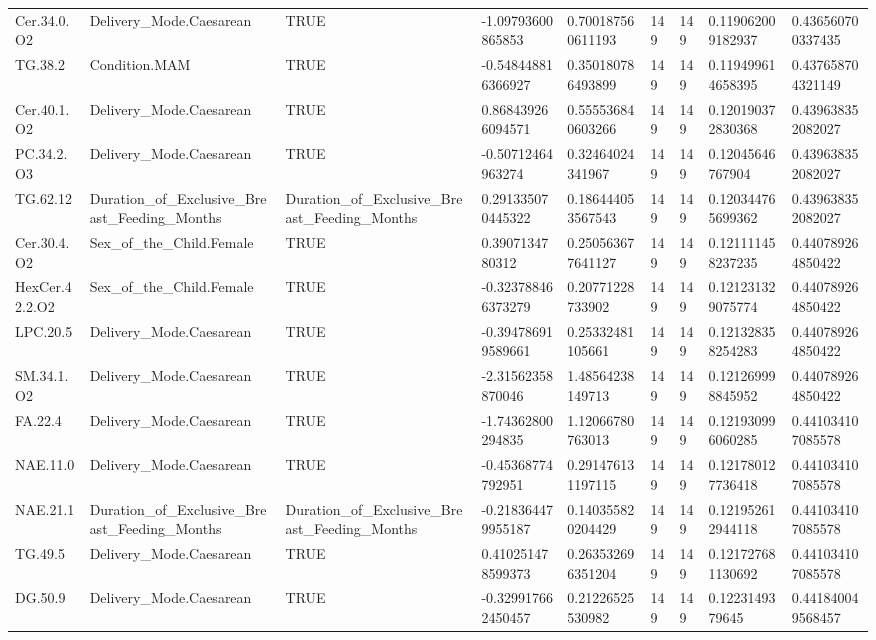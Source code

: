 \begin{longtable}{lllllllll}
Cer.34.0.O2 & Delivery\_Mode.Caesarean & TRUE & -1.09793600865853 & 0.700187560611193 & 149 & 149 & 0.119062009182937 & 0.436560700337435 \\
TG.38.2 & Condition.MAM & TRUE & -0.548448816366927 & 0.350180786493899 & 149 & 149 & 0.119499614658395 & 0.437658704321149 \\
Cer.40.1.O2 & Delivery\_Mode.Caesarean & TRUE & 0.868439266094571 & 0.555536840603266 & 149 & 149 & 0.120190372830368 & 0.439638352082027 \\
PC.34.2.O3 & Delivery\_Mode.Caesarean & TRUE & -0.50712464963274 & 0.32464024341967 & 149 & 149 & 0.12045646767904 & 0.439638352082027 \\
TG.62.12 & Duration\_of\_Exclusive\_Breast\_Feeding\_Months & Duration\_of\_Exclusive\_Breast\_Feeding\_Months & 0.291335070445322 & 0.186444053567543 & 149 & 149 & 0.120344765699362 & 0.439638352082027 \\
Cer.30.4.O2 & Sex\_of\_the\_Child.Female & TRUE & 0.3907134780312 & 0.250563677641127 & 149 & 149 & 0.121111458237235 & 0.440789264850422 \\
HexCer.42.2.O2 & Sex\_of\_the\_Child.Female & TRUE & -0.323788466373279 & 0.20771228733902 & 149 & 149 & 0.121231329075774 & 0.440789264850422 \\
LPC.20.5 & Delivery\_Mode.Caesarean & TRUE & -0.394786919589661 & 0.25332481105661 & 149 & 149 & 0.121328358254283 & 0.440789264850422 \\
SM.34.1.O2 & Delivery\_Mode.Caesarean & TRUE & -2.31562358870046 & 1.48564238149713 & 149 & 149 & 0.121269998845952 & 0.440789264850422 \\
FA.22.4 & Delivery\_Mode.Caesarean & TRUE & -1.74362800294835 & 1.12066780763013 & 149 & 149 & 0.121930996060285 & 0.441034107085578 \\
NAE.11.0 & Delivery\_Mode.Caesarean & TRUE & -0.45368774792951 & 0.291476131197115 & 149 & 149 & 0.121780127736418 & 0.441034107085578 \\
NAE.21.1 & Duration\_of\_Exclusive\_Breast\_Feeding\_Months & Duration\_of\_Exclusive\_Breast\_Feeding\_Months & -0.218364479955187 & 0.140355820204429 & 149 & 149 & 0.121952612944118 & 0.441034107085578 \\
TG.49.5 & Delivery\_Mode.Caesarean & TRUE & 0.410251478599373 & 0.263532696351204 & 149 & 149 & 0.121727681130692 & 0.441034107085578 \\
DG.50.9 & Delivery\_Mode.Caesarean & TRUE & -0.329917662450457 & 0.21226525530982 & 149 & 149 & 0.1223149379645 & 0.441840049568457 \\

\end{longtable}
